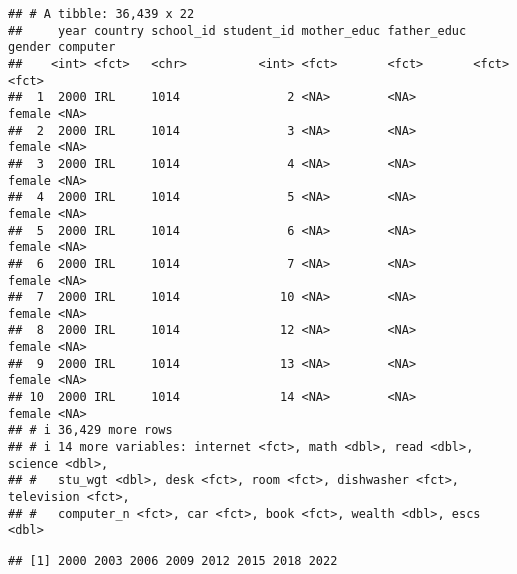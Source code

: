 \documentclass[
]{article}
\newenvironment{Shaded}{\begin{snugshade}}{\end{snugshade}}
\newcommand{\AttributeTok}[1]{\textcolor[rgb]{0.13,0.29,0.53}{#1}}
\newcommand{\CommentTok}[1]{\textcolor[rgb]{0.56,0.35,0.01}{\textit{#1}}}
\newcommand{\DecValTok}[1]{\textcolor[rgb]{0.00,0.00,0.81}{#1}}
\newcommand{\FloatTok}[1]{\textcolor[rgb]{0.00,0.00,0.81}{#1}}
\newcommand{\FunctionTok}[1]{\textcolor[rgb]{0.13,0.29,0.53}{\textbf{#1}}}
\newcommand{\NormalTok}[1]{#1}
\newcommand{\OtherTok}[1]{\textcolor[rgb]{0.56,0.35,0.01}{#1}}
\newcommand{\SpecialCharTok}[1]{\textcolor[rgb]{0.81,0.36,0.00}{\textbf{#1}}}
\newcommand{\StringTok}[1]{\textcolor[rgb]{0.31,0.60,0.02}{#1}}
\begin{document}
\begin{verbatim}
## # A tibble: 36,439 x 22
##     year country school_id student_id mother_educ father_educ gender computer
##    <int> <fct>   <chr>          <int> <fct>       <fct>       <fct>  <fct>   
##  1  2000 IRL     1014               2 <NA>        <NA>        female <NA>    
##  2  2000 IRL     1014               3 <NA>        <NA>        female <NA>    
##  3  2000 IRL     1014               4 <NA>        <NA>        female <NA>    
##  4  2000 IRL     1014               5 <NA>        <NA>        female <NA>    
##  5  2000 IRL     1014               6 <NA>        <NA>        female <NA>    
##  6  2000 IRL     1014               7 <NA>        <NA>        female <NA>    
##  7  2000 IRL     1014              10 <NA>        <NA>        female <NA>    
##  8  2000 IRL     1014              12 <NA>        <NA>        female <NA>    
##  9  2000 IRL     1014              13 <NA>        <NA>        female <NA>    
## 10  2000 IRL     1014              14 <NA>        <NA>        female <NA>    
## # i 36,429 more rows
## # i 14 more variables: internet <fct>, math <dbl>, read <dbl>, science <dbl>,
## #   stu_wgt <dbl>, desk <fct>, room <fct>, dishwasher <fct>, television <fct>,
## #   computer_n <fct>, car <fct>, book <fct>, wealth <dbl>, escs <dbl>
\end{verbatim}

\begin{Shaded}
\end{Shaded}

\begin{verbatim}
## [1] 2000 2003 2006 2009 2012 2015 2018 2022
\end{verbatim}

\begin{Shaded}
\end{Shaded}
\end{document}
